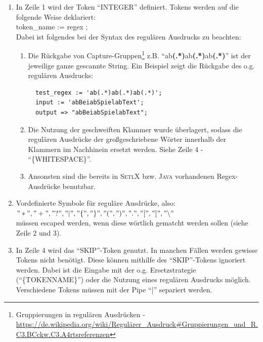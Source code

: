\begin{enumerate}
	\item In Zeile 1 wird der Token "`INTEGER"' definiert. Tokens werden auf die folgende Weise deklariert:\\
					token\_name := regex ; \\
					Dabei ist folgendes bei der Syntax des regulären Ausdrucks zu beachten:
					\begin{enumerate}
						\item Die Rückgabe von Capture-Gruppen\footnote{Gruppierungen in regulären Ausdrücken -  \url{https://de.wikipedia.org/wiki/Regulärer_Ausdruck\#Gruppierungen_und_R.C3.BCckw.C3.A4rtsreferenzen}} z.B. "`ab\textbf{(.*)}ab\textbf{(.*)}ab\textbf{(.*)}"'	ist der jeweilige ganze gescannte String. Ein Beispiel zeigt die Rückgabe des o.g. regulären Ausdrucks:
						\begin{Verbatim}
  test_regex := 'ab(.*)ab(.*)ab(.*)';
  input := 'abBeiabSpielabText';
  output => "abBeiabSpielabText";
						\end{Verbatim}						
						\item Die Nutzung der geschweiften Klammer wurde überlagert, sodass die regulären Ausdrücke der großgeschriebene Wörter innerhalb der Klammern im Nachhinein ersetzt werden. Siehe Zeile 4 - "`\{WHITESPACE\}"'.
						\item Ansonsten sind die bereits in \textsc{SetlX} bzw. \textsc{Java} vorhandenen Regex-Ausdrücke benutzbar.
					\end{enumerate}
	\item Vordefinierte Symbole für reguläre Ausdrücke, also:\\ 
	$"*","+","?","|","\{","\}","(",")",".","[","]","\backslash"$ \\
	müssen escaped werden, wenn diese wörtlich gematcht werden sollen (siehe Zeile 2 und 3).
	\item In Zeile 4 wird das "`SKIP"'-Token genutzt. In manchen Fällen werden gewisse Tokens nicht benötigt. Diese können mithilfe des "`SKIP"'-Tokens ignoriert werden. Dabei ist die Eingabe mit der o.g. Ersetzstrategie ("`\{TOKENNAME\}"') oder die Nutzung eines regulären Ausdrucks möglich. Verschiedene Tokens müssen mit der Pipe "`|"' separiert werden.
\end{enumerate}

